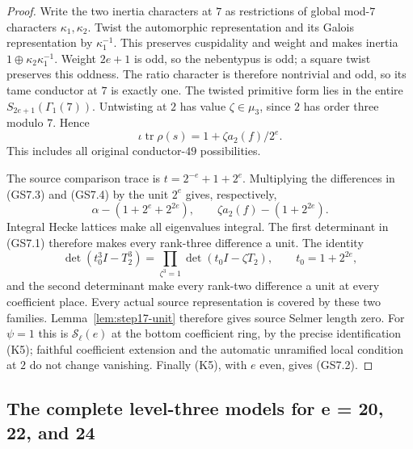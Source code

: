 \documentclass[11pt,a4paper]{article}
\theoremstyle{definition}
\begin{document}
\begin{proof}
Write the two inertia characters at $7$ as restrictions of global
mod-$7$ characters $\kappa_1,\kappa_2$. Twist the automorphic
representation and its Galois representation by $\kappa_1^{-1}$.
This preserves cuspidality and weight and makes inertia
$1\oplus\kappa_2\kappa_1^{-1}$. Weight $2e+1$ is odd, so the
nebentypus is odd; a square twist preserves this oddness. The
ratio character is therefore nontrivial and odd, so its tame
conductor at $7$ is exactly one. The twisted primitive form lies
in the entire $S_{2e+1}(\Gamma_1(7))$. Untwisting at $2$ has value
$\zeta\in\mu_3$, since $2$ has order three modulo $7$. Hence
\[
        \iota\operatorname{tr}\rho(s)
                     =1+\zeta a_2(f)/2^e.
 \tag{GS7.4}
\]
This includes all original conductor-$49$ possibilities.

The source comparison trace is
$t=2^{-e}+1+2^e$. Multiplying the differences in (GS7.3) and
(GS7.4) by the unit $2^e$ gives, respectively,
\[
       \alpha-(1+2^e+2^{2e}),\qquad
       \zeta a_2(f)-(1+2^{2e}).
\]
Integral Hecke lattices make all eigenvalues integral. The first
determinant in (GS7.1) therefore makes every rank-three difference
a unit. The identity
\[
 \det(t_0^3I-T_2^3)
    =\prod_{\zeta^3=1}\det(t_0I-\zeta T_2),
       \qquad t_0=1+2^{2e},
\]
and the second determinant make every rank-two difference a unit
at every coefficient place. Every actual source representation
is covered by these two families. Lemma~\ref{lem:step17-unit}
therefore gives source Selmer length zero. For $\psi=1$ this is
$\mathcal S_\ell(e)$ at the bottom coefficient ring, by the
precise identification (K5); faithful coefficient extension and
the automatic unramified local condition at $2$ do not change
vanishing. Finally (K5), with $e$ even, gives (GS7.2).
\end{proof}

\subsection{The complete level-three models for e = 20, 22, and 24}
\label{sec:u3-higher3}
\end{document}
